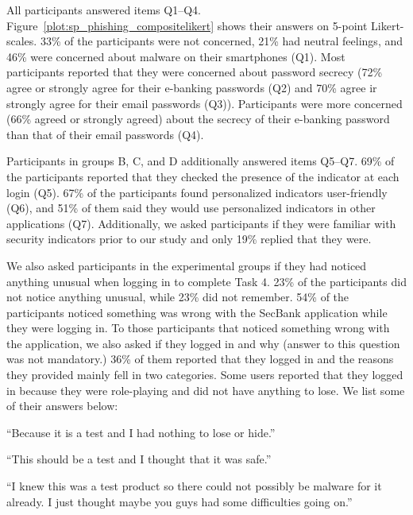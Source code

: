 All participants answered items Q1--Q4.
Figure~\ref{plot:sp_phishing_compositelikert} shows their answers on 5-point Likert-scales.
33\% of the participants were not concerned,
21\% had neutral feelings, and 46\% were concerned about malware on their smartphones (Q1). 
Most participants
reported that they were concerned about password secrecy (72\% agree or strongly agree for their e-banking passwords (Q2)
and 70\% agree ir strongly agree for their email passwords (Q3)).
Participants were more concerned (66\% agreed or strongly agreed) about the secrecy of their
e-banking password than that of their email passwords (Q4).

Participants in groups B, C, and D additionally answered items Q5--Q7. 69\% of
the participants reported that they checked the presence of the indicator at
each login (Q5). 67\% of the participants found personalized indicators
user-friendly (Q6), and 51\% of them said they would use personalized
indicators in other applications (Q7). Additionally, we asked participants if
they were familiar with security indicators prior to our study and only 19\%
replied that they were.

We also asked participants in the experimental groups if they had noticed anything unusual when logging in to complete Task 4.
23\% of the participants did not notice anything unusual, while 23\% did not remember.
54\% of the participants noticed something was wrong with the SecBank application while they were logging in.
To those participants that noticed something wrong with the application, we also asked if they logged in and why (answer to this question was not mandatory.)
36\% of them reported that they logged in and the reasons they provided mainly fell in two categories.
Some users reported that they logged in because they were role-playing and did not have anything to lose.
We list some of their answers below:

\begin{myquote}
  ``Because it is a test and I had nothing to lose or hide.''
\end{myquote}
\begin{myquote}
  ``This should be a test and I thought that it was safe.''
\end{myquote}
\begin{myquote}
  ``I knew this was a test product so there could not possibly be malware for it
  already. I just thought maybe you guys had some difficulties going on.''
\end{myquote}

